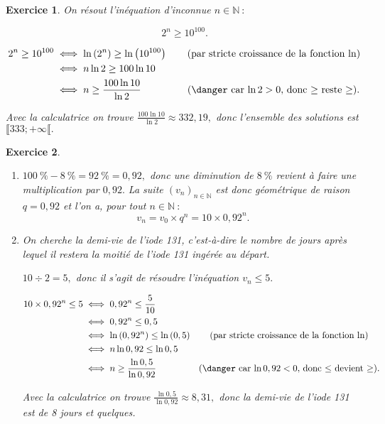\documentclass[10pt]{article}
\newtheorem{exo}{Exercice}
\begin{document}
\begin{exo}

On résout l'inéquation d’inconnue $n\in\mathbb{N}~:$

\[2^n\geq 10^{100}.\]

\begin{align*}
2^n\geq 10^{100}&\iff\ln\left(2^n\right)\geq \ln \left(10^{100}\right)\qquad\text{(par stricte croissance de la fonction $\ln$)}\\
&\iff n\ln 2 \geq 100\ln 10\\
&\iff n\geq \frac{100\ln 10}{\ln 2} \qquad\qquad~~\text{(\danger car $\ln 2>0,$ donc $\geq$ reste $\geq$)}.
\end{align*}

Avec la calculatrice on trouve $\frac{100\ln 10}{\ln 2}\approx 332,19,$ donc l'ensemble des solutions est $\llbracket 333;+\infty \llbracket.$


\end{exo}

\begin{exo}



\begin{enumerate}
\item $100~\%-8~\%=92~\%=0,92,$ donc une diminution de $8~\%$ revient à faire une multiplication par $0,92.$ La suite $\left(v_n\right)_{n\in\mathbb{N}}$ est donc géométrique de raison $q=0,92$ et l'on a, pour tout $n\in\mathbb{N}~:$
\[v_n=v_0\times q^n=10\times 0,92^n.\]
\item On cherche la demi-vie de l'iode 131, c'est-à-dire le nombre de jours après lequel il restera la moitié de l'iode 131 ingérée au départ.

\medskip

$10\div 2=5,$ donc il s'agit de résoudre l'inéquation $v_n\leq 5.$

\begin{align*}
10\times 0,92^n\leq 5&\iff 0,92^n\leq \frac{5}{10}\\&\iff 0,92^n\leq 0,5\\
&\iff \ln\left(0,92^n\right)\leq \ln \left(0,5\right)\qquad\text{(par stricte croissance de la fonction $\ln$)}\\
&\iff n\ln 0,92 \leq \ln 0,5\\
&\iff n\geq \frac{\ln 0,5}{\ln 0,92} \qquad\qquad~~\text{(\danger car $\ln 0,92<0,$ donc $\leq$ devient $\geq$)}.
\end{align*}

Avec la calculatrice on trouve $\frac{\ln 0,5}{\ln 0,92}\approx 8,31,$ donc la demi-vie de l'iode 131 est de 8 jours et quelques.

\end{enumerate}



\end{exo}
\end{document}
